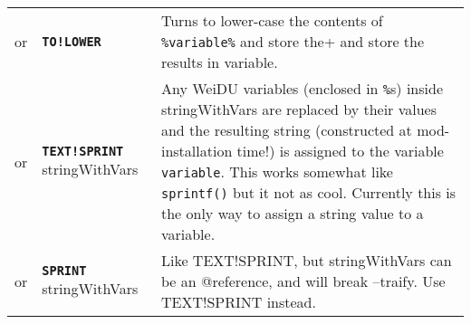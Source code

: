 \documentclass{article}
\def\ttref#1{\ahrefloc{#1}{\tt #1}}
\def\DEFINE#1{{\tt \bf #1}\label{#1}\index{#1}}
\def\t#1{{\tt #1}}
\begin{document}
\begin{tabular}{cp{10in}|p{10in}}
or & \DEFINE{TO!LOWER} \ttref{variable} &
  Turns to lower-case the contents of \verb+%variable%+ and store the
  results in variable. \\
or & \DEFINE{TEXT!SPRINT} \ttref{variable} stringWithVars &
  Any WeiDU variables (enclosed in \t{\%}s) inside stringWithVars are
  replaced by their values and the resulting string (constructed at
  mod-installation time!) is assigned to the variable \t{variable}.
  This works somewhat like \t{sprintf()} but it not as cool. Currently this
  is the only way to assign a string value to a variable. \\
or & \DEFINE{SPRINT} \ttref{variable} stringWithVars &
  Like TEXT!SPRINT, but stringWithVars can be an @reference, and will
  break --traify. Use TEXT!SPRINT instead. \\


\end{tabular}
\end{document}
